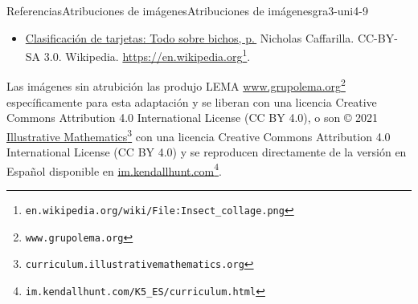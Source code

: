 %
%
\typeout{************************************************}
\typeout{************************************************}
%
\clearpage
\begin{references-section}{Referencias}{Atribuciones de imágenes}{}{Atribuciones de imágenes}{}{}{gra3-uni4-9}
%
\begin{itemize}[label=\textbullet]
\item{}\hyperref[act-clasificacionDeTarjetas-todoSobreBichos]{Clasificación de tarjetas: Todo sobre bichos, p.\,\pageref{act-clasificacionDeTarjetas-todoSobreBichos}} Nicholas Caffarilla. CC-BY-SA 3.0. Wikipedia. \href{https://en.wikipedia.org/wiki/File:Insect_collage.png}{https:\slash{}\slash{}en.wikipedia.org}\footnote{\nolinkurl{en.wikipedia.org/wiki/File:Insect_collage.png}\label{gra3-uni4-9-2-4-3}}.%
\end{itemize}
Las imágenes sin atrubición las produjo LEMA \href{https://www.grupolema.org}{www.grupolema.org}\footnote{\nolinkurl{www.grupolema.org}\label{gra3-uni4-9-3-2}} específicamente para esta adaptación y se liberan con una licencia Creative Commons Attribution 4.0 International License (CC BY 4.0), o son © 2021 \href{https://curriculum.illustrativemathematics.org}{Illustrative Mathematics}\footnote{\nolinkurl{curriculum.illustrativemathematics.org}\label{gra3-uni4-9-3-4}} con una licencia Creative Commons Attribution 4.0 International License (CC BY 4.0) y se reproducen directamente de la versión en Español disponible en \href{https://im.kendallhunt.com/K5_ES/curriculum.html}{im.kendallhunt.com}\footnote{\nolinkurl{im.kendallhunt.com/K5_ES/curriculum.html}\label{gra3-uni4-9-3-6}}.%
\end{references-section}

